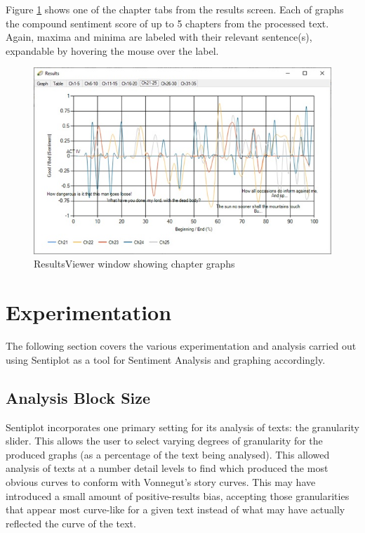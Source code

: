 \documentclass{article}
\begin{document}
        Figure \ref{fig:resultschapters} shows one of the chapter tabs from the results screen. Each of graphs the compound sentiment score of up to 5 chapters from the processed text. Again, maxima and minima are labeled with their relevant sentence(s), expandable by hovering the mouse over the label.
        \begin{figure}[H]
            \includegraphics[width=1\textwidth]{Misc/resultschapters}
            \caption{ResultsViewer window showing chapter graphs}
            \label{fig:resultschapters}
        \end{figure}
\newpage
\section{Experimentation}
The following section covers the various experimentation and analysis carried out using Sentiplot as a tool for Sentiment Analysis and graphing accordingly.
    \subsection{Analysis Block Size}
        Sentiplot incorporates one primary setting for its analysis of texts: the granularity slider. This allows the user to select varying degrees of granularity for the produced graphs (as a percentage of the text being analysed). This allowed analysis of texts at a number detail levels to find which produced the most obvious curves to conform with Vonnegut's story curves. This may have introduced a small amount of positive-results bias, accepting those granularities that appear most curve-like for a given text instead of what may have actually reflected the curve of the text.
\end{document}
